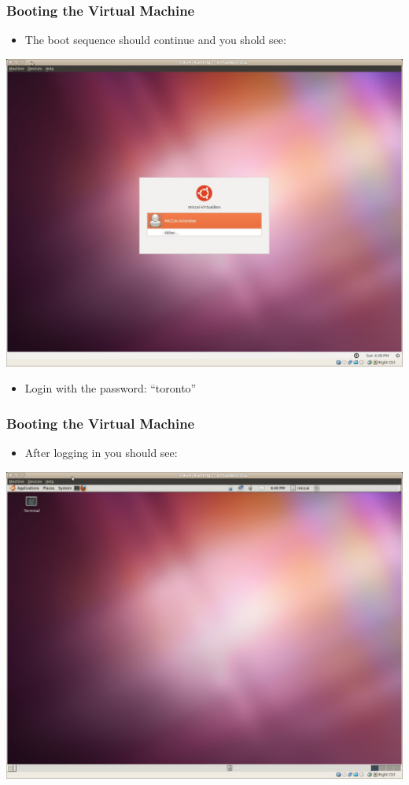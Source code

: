 \begin{frame}
\frametitle{Booting the Virtual Machine}
\begin{itemize}
\item The boot sequence should continue and you shold see:
\end{itemize}
\begin{center}
  \includegraphics[width=0.7\paperwidth]{../Art/Screenshot-ITKv4-VirtualBox-01.jpg}
\end{center}
\begin{itemize}
\item Login with the password: ``toronto''
\end{itemize}
\end{frame}

\begin{frame}
\frametitle{Booting the Virtual Machine}
\begin{itemize}
\item After logging in you should see:
\end{itemize}
\begin{center}
  \includegraphics[width=0.7\paperwidth]{../Art/Screenshot-ITKv4-VirtualBox-02.jpg}
\end{center}
\end{frame}



